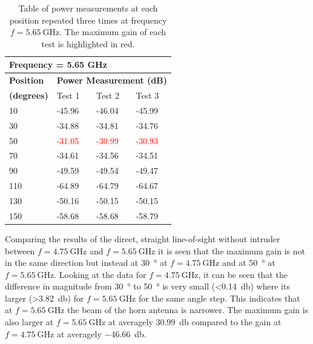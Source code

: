 \begin{table}[H]
    \centering
    \begin{tabular}{l|l|l|l}
        \multicolumn{4}{l}{\textbf{Frequency = 5.65 GHz}}         \\
        \hline
        \textbf{Position} & \multicolumn{3}{l}{\textbf{Power Measurement (dB)}} \\
        \textbf{(degrees)}  & Test 1    & Test 2  & Test 3  \\
        \hline
        \hline
        10      & -45.96    & -46.04    & -45.99 \\
        30      & -34.88    & -34.81    & -34.76 \\
        50      & \textcolor{red}{-31.05}    & \textcolor{red}{-30.99}    & \textcolor{red}{-30.93} \\
        70      & -34.61    & -34.56    & -34.51 \\
        90      & -49.59    & -49.54    & -49.47 \\
        110     & -64.89    & -64.79    & -64.67 \\
        130     & -50.16    & -50.15    & -50.15 \\
        150     & -58.68    & -58.68    & -58.79
        \end{tabular}
    \caption{Table of power measurements at each position repeated three times at frequency $f=\SI{5.65}{\giga\hertz}$. The maximum gain of each test is highlighted in red.}
    \label{tab:a2_1b}
\end{table}

Comparing the results of the direct, straight line-of-sight without intruder between $f=\SI{4.75}{\giga\hertz}$ and $f=\SI{5.65}{\giga\hertz}$ it is seen that the maximum gain is not in the same direction but instead at \SI{30}{\degree} at $f=\SI{4.75}{\giga\hertz}$ and at \SI{50}{\degree} at $f=\SI{5.65}{\giga\hertz}$. Looking at the data for $f=\SI{4.75}{\giga\hertz}$, it can be seen that the difference in magnitude from \SI{30}{\degree} to \SI{50}{\degree} is very small (<\SI{0.14}{\decibel}) where its larger (>\SI{3.82}{\decibel}) for $f=\SI{5.65}{\giga\hertz}$ for the same angle step. This indicates that at $f=\SI{5.65}{\giga\hertz}$ the beam of the horn antenna is narrower. The maximum gain is also larger at $f=\SI{5.65}{\giga\hertz}$ at averagely \SI{30.99}{\decibel} compared to the gain at $f=\SI{4.75}{\giga\hertz}$ at averagely \SI{-46.66}{\decibel}.

